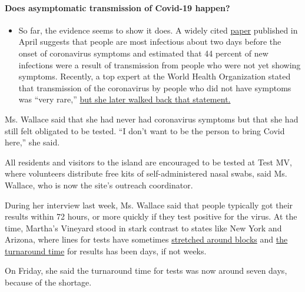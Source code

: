 \begin{itemize}
{  \paragraph{Does asymptomatic transmission of Covid-19
  happen?}\label{does-asymptomatic-transmission-of-covid-19-happen}}

  \begin{itemize}
  \tightlist
  \item
    So far, the evidence seems to show it does. A widely cited
    \href{https://www.nature.com/articles/s41591-020-0869-5}{paper}
    published in April suggests that people are most infectious about
    two days before the onset of coronavirus symptoms and estimated that
    44 percent of new infections were a result of transmission from
    people who were not yet showing symptoms. Recently, a top expert at
    the World Health Organization stated that transmission of the
    coronavirus by people who did not have symptoms was ``very rare,''
    \href{https://www.nytimes.com/2020/06/09/world/coronavirus-updates.html?action=click\&pgtype=Article\&state=default\&region=MAIN_CONTENT_3\&context=storylines_faq\#link-1f302e21}{but
    she later walked back that statement.}
  \end{itemize}
\end{itemize}

Ms. Wallace said that she had never had coronavirus symptoms but that
she had still felt obligated to be tested. ``I don't want to be the
person to bring Covid here,'' she said.

All residents and visitors to the island are encouraged to be tested at
Test MV, where volunteers distribute free kits of self-administered
nasal swabs, said Ms. Wallace, who is now the site's outreach
coordinator.

During her interview last week, Ms. Wallace said that people typically
got their results within 72 hours, or more quickly if they test positive
for the virus. At the time, Martha's Vineyard stood in stark contrast to
states like New York and Arizona, where lines for tests have sometimes
\href{https://www.nytimes.com/2020/07/06/us/coronavirus-test-shortage.html}{stretched
around blocks} and
\href{https://www.azcentral.com/story/news/local/arizona-health/2020/07/06/slow-covid-19-test-results-have-cascade-effect-public-health/5386582002/}{the
turnaround time} for results has been days, if not weeks.

On Friday, she said the turnaround time for tests was now around seven
days, because of the shortage.

